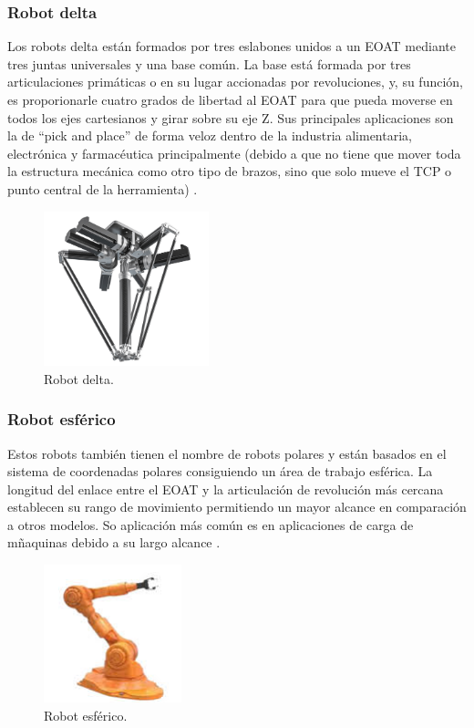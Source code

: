 \subsubsection{Robot delta}
Los robots delta están formados por tres eslabones unidos a un EOAT mediante tres juntas universales y una base común. La base está formada por tres articulaciones primáticas o en su lugar accionadas por revoluciones, y, su función, es proporionarle cuatro grados de libertad al EOAT para que pueda moverse en todos los ejes cartesianos y girar sobre su eje Z. Sus principales aplicaciones son la de ``pick and place'' de forma veloz dentro de la industria alimentaria, electrónica y farmacéutica principalmente (debido a que no tiene que mover toda la estructura mecánica como otro tipo de brazos, sino que solo mueve el TCP o punto central de la herramienta) \cite{tipos_robots_2}.


\begin{figure} [h!]
  \begin{center}
    \includegraphics[width=4.8cm]{figs/robot_delta}
  \end{center}
  \caption{\centering Robot delta.}
  \label{fig:robot_delta}
\end{figure} 

\subsubsection{Robot esférico}

Estos robots también tienen el nombre de robots polares y están basados en el sistema de coordenadas polares consiguiendo un área de trabajo esférica. La longitud del enlace entre el EOAT y la articulación de revolución más cercana establecen su rango de movimiento permitiendo un mayor alcance en comparación a otros modelos. So aplicación más común es en aplicaciones de carga de mñaquinas debido a su largo alcance \cite{tipos_robots_2}.

\begin{figure} [h!]
  \begin{center}
    \includegraphics[width=4cm]{figs/robot_esferico}
  \end{center}
  \caption{\centering Robot esférico.}
  \label{fig:robot_esferico}
\end{figure} 

